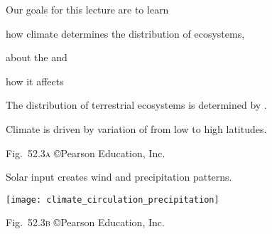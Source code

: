 \documentclass[t]{beamer}
\begin{document}

\begin{frame}{Our goals for this lecture are to learn}

	\hangpara how climate determines the distribution of ecosystems,
	
	\hangpara about the  and
	
	\hangpara how it affects  
	
\end{frame}
%
{
	\begin{frame}[b]{The distribution of terrestrial ecosystems is determined by .}
		
	\end{frame}
}
%


{
	\begin{frame}[b]{Climate is driven by variation of  from low to high latitudes.}
		
		\hfill \tiny Fig.~52.3\textsc{a} \copyright Pearson Education, Inc.
	\end{frame}
}
%
{
	\begin{frame}[t]{Solar input creates wind and precipitation patterns.}
		
		\texttt{[image: climate\_circulation\_precipitation]}
		
		\vfilll
		
		\hfill \tiny Fig.~52.3\textsc{b} \copyright Pearson Education, Inc.
	\end{frame}
}
%
\end{document}

